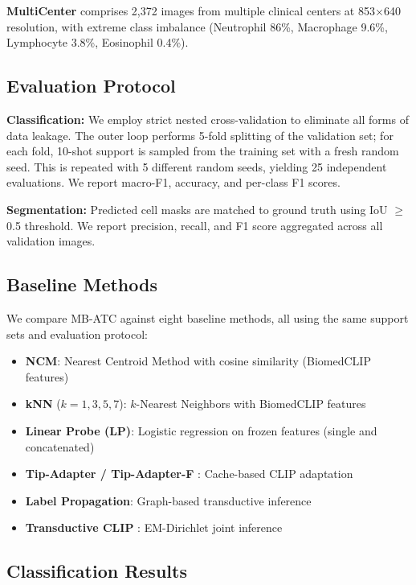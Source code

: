\documentclass[preprint,review,12pt]{elsarticle}
\begin{document}
\textbf{MultiCenter} comprises 2,372 images from multiple clinical centers at 853$\times$640 resolution, with extreme class imbalance (Neutrophil 86\%, Macrophage 9.6\%, Lymphocyte 3.8\%, Eosinophil 0.4\%).

\subsection{Evaluation Protocol}

\textbf{Classification:} We employ strict nested cross-validation to eliminate all forms of data leakage. The outer loop performs 5-fold splitting of the validation set; for each fold, 10-shot support is sampled from the training set with a fresh random seed. This is repeated with 5 different random seeds, yielding 25 independent evaluations. We report macro-F1, accuracy, and per-class F1 scores.

\textbf{Segmentation:} Predicted cell masks are matched to ground truth using IoU $\geq$ 0.5 threshold. We report precision, recall, and F1 score aggregated across all validation images.

\subsection{Baseline Methods}

We compare MB-ATC against eight baseline methods, all using the same support sets and evaluation protocol:
\begin{itemize}
    \item \textbf{NCM}: Nearest Centroid Method with cosine similarity (BiomedCLIP features)
    \item \textbf{kNN} ($k=1,3,5,7$): $k$-Nearest Neighbors with BiomedCLIP features
    \item \textbf{Linear Probe (LP)}: Logistic regression on frozen features (single and concatenated)
    \item \textbf{Tip-Adapter / Tip-Adapter-F} \cite{zhang2022tip}: Cache-based CLIP adaptation
    \item \textbf{Label Propagation}: Graph-based transductive inference
    \item \textbf{Transductive CLIP} \cite{martin2024transductive}: EM-Dirichlet joint inference
\end{itemize}

\subsection{Classification Results}
\end{document}

